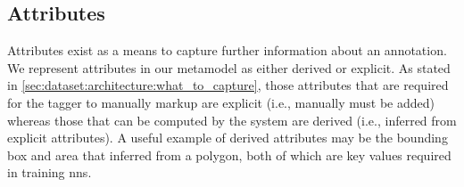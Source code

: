 \subsection{Attributes}

Attributes exist as a means to capture further information about an annotation. We represent attributes in our metamodel as either derived or explicit. As stated in \cref{sec:dataset:architecture:what_to_capture}, those attributes that are required for the tagger to manually markup are explicit (i.e., manually must be added) whereas those that can be computed by the system are derived (i.e., inferred from explicit attributes). A useful example of derived attributes may be the bounding box and area that inferred from a polygon, both of which are key values required in training \glspl{nn}.